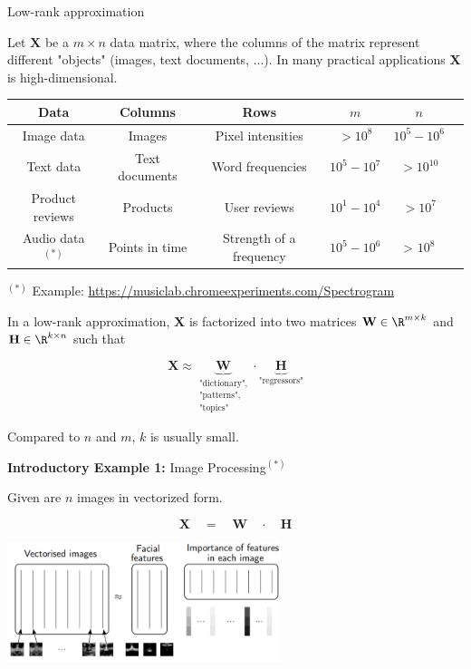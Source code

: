 \documentclass[11pt,compress,t,notes=noshow, xcolor=table]{beamer}
\begin{document}
\begin{vbframe}{Low-rank approximation}

Let $\mathbf{X}$ be a $m \times n$ data matrix, where the columns of the matrix represent different "objects" (images, text documents, ...). In many practical applications $\mathbf{X}$ is high-dimensional.

\begin{footnotesize}
\begin{table}[]
\centering
\begin{tabular}{cccccc}
Data & Columns & Rows & $m$ & $n$\\
\hline
Image data & Images & Pixel intensities & $> 10^{8}$ & $10^5 - 10^6$\\
Text data & Text documents & Word frequencies & $10^5 - 10^7$ & $> 10^{10}$\\
Product reviews & Products & User reviews  & $10^1 - 10^4$ & $> 10^{7}$ \\
Audio data$^{(*)}$ & Points in time & Strength of a frequency & $10^5 - 10^6$ & > $10^{8}$
\end{tabular}
\end{table}
\end{footnotesize}

\vfill
\begin{footnotesize}
$^{(*)}$ Example: \url{https://musiclab.chromeexperiments.com/Spectrogram}
\end{footnotesize}

\framebreak

In a low-rank approximation, $\mathbf{X}$ is factorized into two matrices $\mathbf{W} \in \R^{m \times k}$ and $\mathbf{H} \in \R^{k \times n}$ such that

$$
\mathbf{X} \approx \underbrace{\mathbf{W}}_{\substack{\text{"dictionary",}\\ \text{"patterns",} \\ \text{"topics"}}} \cdot \underbrace{\mathbf{H}}_{\text{"regressors"}}
$$

Compared to $n$ and $m$, $k$ is usually small.

\framebreak

\textbf{Introductory Example 1:} Image Processing$^{(*)}$

\lz

Given are $n$ images in vectorized form.

$$
\bm{X} \quad = \quad \bm{W} \quad \cdot \quad \bm{H}
$$
\begin{center}
\includegraphics[width=0.6\textwidth]{figure_man/pixel.png}
\end{center}


\end{vbframe}
\end{document}
